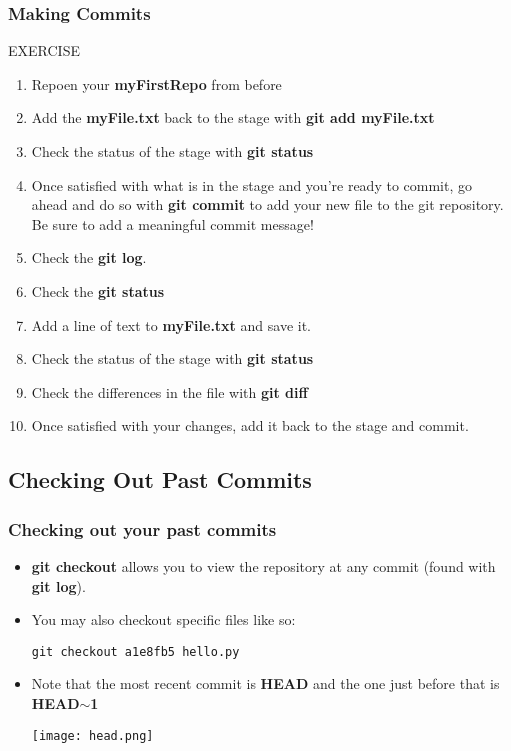 \documentclass{beamer}
\begin{document}
\begin{frame}[fragile]
\frametitle{Making Commits}
    \begin{block}{EXERCISE}
        \begin{enumerate}
        \item Repoen your \textbf{myFirstRepo} from before
	 \item Add the \textbf{myFile.txt} back to the stage with \textbf{git add myFile.txt}
	 \item Check the status of the stage with \textbf{git status}
        \item Once satisfied with what is in the stage and you're ready to commit, go ahead and do so with \textbf{git commit} to add your new file to the git repository. Be sure to add a meaningful commit message!
        \item Check the \textbf{git log}.
	 \item Check the \textbf{git status}
 	 \item Add a line of text to \textbf{myFile.txt} and save it.
	 \item Check the status of the stage with \textbf{git status}
	 \item Check the differences in the file with \textbf{git diff}
	 \item Once satisfied with your changes, add it back to the stage and commit. 
        \end{enumerate}
    \end{block}
\end{frame}

\subsection{Checking Out Past Commits}

\begin{frame}[fragile]
\frametitle{Checking out your past commits}
\begin{itemize}
\item \textbf{git checkout} allows you to view the repository at any commit (found with \textbf{git log}).
\item You may also checkout specific files like so: 
        \begin{lstlisting}
git checkout a1e8fb5 hello.py
        \end{lstlisting}
\item Note that the most recent commit is \textbf{HEAD} and the one just before that is \textbf{HEAD$\mathbf{\sim}$1}
\begin{center}\texttt{[image: head.png]}\end{center}
\end{itemize}
\end{frame}
\end{document}
